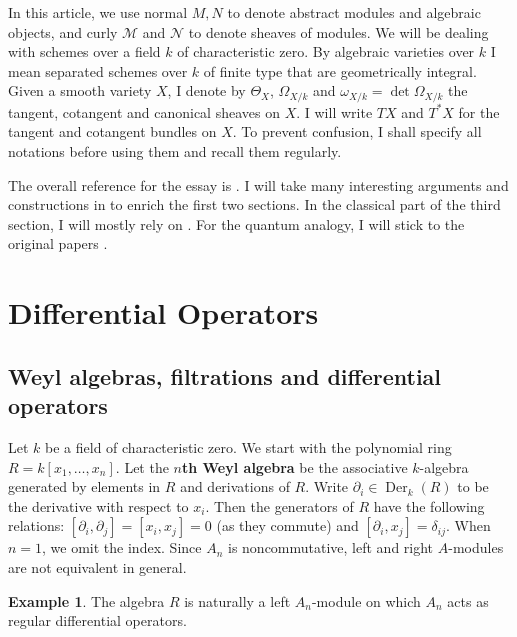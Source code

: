 \documentclass[11pt, a4paper]{article}
\theoremstyle{definition}
\newtheorem{example}[theorem]{Example}
\newcommand{\w}[0]{\omega}
\newcommand{\Der}{\operatorname{Der}}
\begin{document}
    In this article, we use normal $M, N$ to denote abstract modules and algebraic objects, and curly $\mathcal M$ and $\mathcal N$ to denote sheaves of modules. We will be dealing with schemes over a field $k$ of characteristic zero. By algebraic varieties over $k$ I mean separated schemes over $k$ of finite type that are geometrically integral. Given a smooth variety $X$, I denote by $\Theta_X$, $\Omega_{X/k}$ and $\w_{X/k}=\det\Omega_{X/k}$ the tangent, cotangent and canonical sheaves on $X$. I will write $TX$ and $T^*X$ for the tangent and cotangent bundles on $X$. To prevent confusion, I shall specify all notations before using them and recall them regularly.

    The overall reference for the essay is \cite{htt-d-modules}. I will take many interesting arguments and constructions in \cite{ginzburg-notes, schnell-notes} to enrich the first two sections. In the classical part of the third section, I will mostly rely on \cite{htt-d-modules, kashiwara-d-modules}. For the quantum analogy, I will stick to the original papers \cite{MR1694897, tanisaki-quantum, backelin-quantum}.
    \section{Differential Operators}
    \subsection{Weyl algebras, filtrations and differential operators}\label{sec-1-1}
    Let $k$ be a field of characteristic zero. We start with the polynomial ring $R=k[x_1,\dots, x_n]$. Let the \textbf{$n$th Weyl algebra} be the associative $k$-algebra generated by elements in $R$ and derivations of $R$. Write $\partial_i\in\Der_k(R)$ to be the derivative with respect to $x_i$. Then the generators of $R$ have the following relations: $[\partial_i,\partial_j]=[x_i, x_j]=0$ (as they commute) and $[\partial_i, x_j]=\delta_{ij}$. When $n=1$, we omit the index. Since $A_n$ is noncommutative, left and right $A$-modules are not equivalent in general.
    \begin{example}
        The algebra $R$ is naturally a left $A_n$-module on which $A_n$ acts as regular differential operators.
    \end{example}
\end{document}
